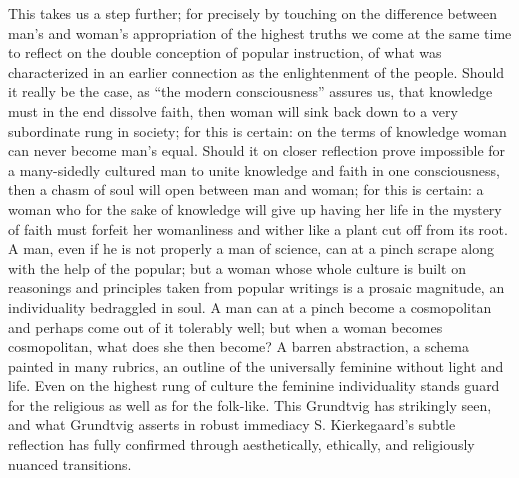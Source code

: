 \documentclass[12pt]{book}
\newcommand{\opage}[1]{\marginnote{\footnotesize\textit{[#1]}}}
\begin{document}
This takes us a step further; for precisely by touching on the difference
between man's and woman's appropriation of the highest truths we come at
the same time to reflect on the double conception of popular instruction,
of what was characterized in an earlier connection as the enlightenment
of the people. Should it really be the case, as ``the modern
consciousness'' assures us, that knowledge must in the end dissolve faith,
then woman will sink back down to a very subordinate rung in society; for
this is certain: on the terms of knowledge woman can never become man's
equal. Should it on closer reflection prove impossible for a many-sidedly
cultured man to unite knowledge and faith in one consciousness, then a
chasm of soul will open between man and woman; for this is certain: a
woman who for the sake of knowledge will give up having her life in the
mystery of faith must forfeit her womanliness and wither like a plant cut
off from its root. A man, even if he is not properly a man of science, can
at a pinch scrape along with the help of the popular; but a woman whose
whole culture is built on reasonings and principles taken from popular
writings is a prosaic magnitude, an individuality bedraggled in soul. A
man can at a pinch become a cosmopolitan and perhaps come out of it
tolerably well;
\opage{286}\setcounter{footnote}{0}%
but when a woman becomes cosmopolitan, what does she then become? A barren
abstraction, a schema painted in many rubrics, an outline of the
universally feminine without light and life. Even on the highest rung of
culture the feminine individuality stands guard for the religious as well
as for the folk-like. This Grundtvig has strikingly seen, and what
Grundtvig asserts in robust immediacy S. Kierkegaard's subtle reflection
has fully confirmed through aesthetically, ethically, and religiously
nuanced transitions.
\end{document}
